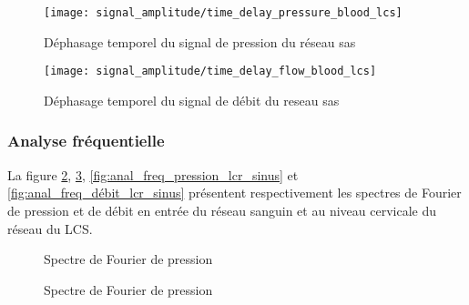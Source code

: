 \documentclass[french]{report}
\begin{document}
\begin{figure}
  \begin{minipage}{0.5\linewidth}
    \centering
    \texttt{[image: signal\_amplitude/time\_delay\_pressure\_blood\_lcs]}
    \caption{Déphasage temporel du signal de pression du réseau sas}
    \label{fig:deph_pression_sang_lcs_sinus}
  \end{minipage}
  \hspace{0.5cm}
  \begin{minipage}{0.5\linewidth}
    \centering
    \texttt{[image: signal\_amplitude/time\_delay\_flow\_blood\_lcs]}
    \caption{Déphasage temporel du signal de débit du reseau sas}
    \label{fig:deph_débit_sang_lcs_sinus}
  \end{minipage}
  
\end{figure}

\subsubsection{Analyse fréquentielle}

La figure \ref{fig:anal_freq_pression_sang_sinus}, \ref{fig:anal_freq_débit_sang_sinus}, \ref{fig:anal_freq_pression_lcr_sinus} et \ref{fig:anal_freq_débit_lcr_sinus} présentent respectivement les spectres de Fourier de pression et de débit en entrée du réseau sanguin et au niveau cervicale du réseau du LCS.


\begin{figure}
    \centering
  \qquad
	\caption{Spectre de Fourier de pression}
  \label{fig:anal_freq_pression_sang_sinus}
\end{figure}

\begin{figure}
    \centering
  \qquad
	\caption{Spectre de Fourier de pression}
  \label{fig:anal_freq_débit_sang_sinus}
\end{figure}
\end{document}
